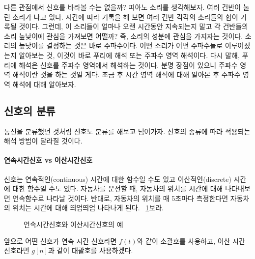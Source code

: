 \par
다른 관점에서 신호를 바라볼 수는 없을까? 피아노 소리를 생각해보자. 여러 건반이 눌린 소리가 나고 있다. 시간에 따라 기록을 해 보면 여러 건반 각각의 소리들의 합이 기록될 것이다.
그런데, 이 소리들이 얼마나 오랜 시간동안 지속되는지 말고 각 건반들의 소리 높낮이에 관심을 가져보면 어떨까?
즉, 소리의 성분에 관심을 가지자는 것이다. 소리의 높낮이를 결정하는 것은 바로 주파수이다.
어떤 소리가 어떤 주파수들로 이루어졌는지 알아보는 것, 이것이 바로 푸리에 해석 또는 주파수 영역 해석\label{freq domain analysis}이다.
다시 말해, 푸리에 해석은 신호를 주파수 영역에서 해석하는 것이다.
분명 장점이 있으니 주파수 영역 해석이란 것을 하는 것일 게다. 조금 후 시간 영역 해석에 대해 알아본 후 주파수 영역 해석에 대해 알아보자.

\subsection{신호의 분류}
통신을 분류했던 것처럼 신호도 분류를 해보고 넘어가자. 신호의 종류에 따라 적용되는 해석 방법이 달라질 것이다.
\paragraph{연속시간신호 vs 이산시간신호}
신호는 연속적인(continuous) 시간에 대한 함수일 수도 있고 이산적인(discrete) 시간에 대한 함수일 수도 있다.
자동차를 운전할 때, 자동차의 위치를 시간에 대해 나타내보면 연속함수로 나타날 것이다. 반대로, 자동차의 위치를 매 5초마다 측정한다면 자동차의 위치는 시간에 대해 띄엄띄엄 나타나게 된다. \figurename~\ref{fig:cont vs disc}\을 보라.
\begin{figure}[!tbp]
    \centering
    \caption{연속시간신호와 이산시간신호의 예}\label{fig:cont vs disc}
\end{figure}
\par
앞으로 어떤 신호가 연속 시간 신호라면 $f(t)$와 같이 소괄호를 사용하고, 이산 시간 신호라면 $g[n]$과 같이 대괄호를 사용하겠다.
